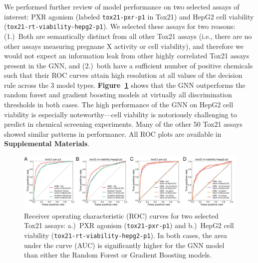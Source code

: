 \documentclass{ws-procs11x85}
\begin{document}
We performed further review of model performance on two selected assays of interest: PXR agonism (labeled \texttt{tox21-pxr-p1} in Tox21) and HepG2 cell viability (\texttt{tox21-rt-viability-hepg2-p1}).
We selected these assays for two reasons: (1.)~Both are semantically distinct from all other Tox21 assays (i.e., there are no other assays measuring pregnane X activity or cell viability), and therefore we would not expect an information leak from other highly correlated Tox21 assays present in the GNN, and (2.)~both have a sufficient number of positive chemicals such that their ROC curves attain high resolution at all values of the decision rule across the 3 model types.
\textbf{Figure~\ref{fig:4}} shows that the GNN outperforms the random forest and gradient boosting models at virtually all discrimination thresholds in both cases. 
The high performance of the GNN on HepG2 cell viability is especially noteworthy---cell viability is notoriously challenging to predict in chemical screening experiments.
Many of the other 50 Tox21 assays showed similar patterns in performance.
All ROC plots are available in \textbf{Supplemental Materials}.

\begin{figure}
   \centering
   \includegraphics[width=\textwidth]{figures/figure3.pdf}
   \caption{Receiver operating characteristic (ROC) curves for two selected Tox21 assays: a.)~PXR agonism (\texttt{tox21-pxr-p1}) and b.)~HepG2 cell viability (\texttt{tox21-rt-viability-hepg2-p1}). In both cases, the area under the curve (AUC) is significantly higher for the GNN model than either the Random Forest or Gradient Boosting models.}\label{fig:4}
\end{figure}
\end{document}
